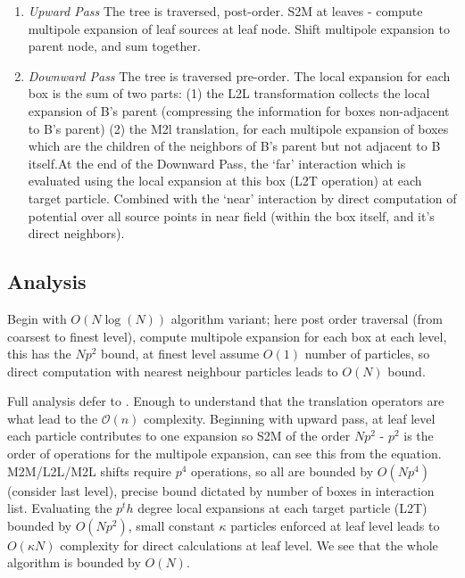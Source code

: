 \begin{enumerate}
    \item \textit{Upward Pass} The tree is traversed, post-order. S2M at leaves
    - compute multipole expansion of leaf sources at leaf node. Shift multipole
    expansion to parent node, and sum together.
    \item \textit{Downward Pass} The tree is traversed pre-order. The local expansion
    for each box is the sum of two parts: (1) the L2L transformation collects the local
    expansion of B's parent (compressing the information for boxes non-adjacent to B's parent)
    (2) the M2l translation, for each multipole expansion of boxes which are the children of
    the neighbors of B's parent but not adjacent to B itself.At the end of the
    Downward Pass, the `far' interaction which is evaluated
    using the local expansion at this box (L2T operation) at each target particle.
    Combined with the `near' interaction by direct computation of potential over all
    source points in near field (within the box itself, and it's direct neighbors).
\end{enumerate}



\subsection{Analysis}

Begin with $O(N\log(N))$ algorithm variant; here post order traversal (from
coarsest to finest level), compute multipole expansion for each box at each level,
this has the $Np^2$ bound, at finest level assume $O(1)$ number of particles, so
direct computation with nearest neighbour particles leads to $O(N)$ bound.

Full analysis defer to \cite{Greengard:1987:Yale}. Enough to understand that the
translation operators are what lead to the $\mathcal{O}(n)$ complexity. Beginning
with upward pass, at leaf level each particle contributes to one expansion so
S2M of the order $Np^2$ - $p^2$ is the order of operations for the multipole
expansion, can see this from the equation. M2M/L2L/M2L shifts require $p^4$
operations, so all are bounded by $O(Np^4)$ (consider last level), precise bound
dictated by number of boxes in interaction list. Evaluating the $p^th$ degree
local expansions at each target particle (L2T) bounded by $O(Np^2)$, small constant
$\kappa$ particles enforced at leaf level leads to $O(\kappa N)$ complexity for
direct calculations at leaf level. We see that the whole algorithm is bounded by
$O(N)$.

\hspace{10pt}
